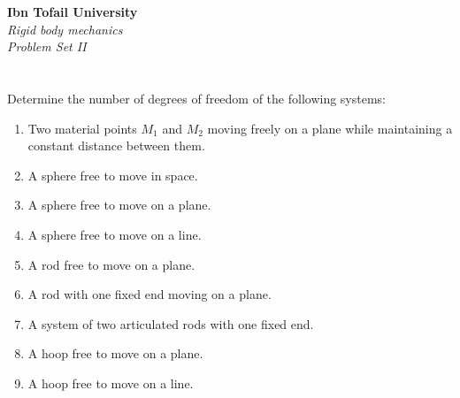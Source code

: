 \documentclass[12pt]{article}
\begin{document}
\begin{center}
\Large\textbf{Ibn Tofail University} \\[1em]
\large\textit{Rigid body mechanics} \\[2em]
\large\textit{Problem Set II} \\[0.5em]
\end{center}

\vspace{1cm}
\section{}

Determine the number of degrees of freedom of the following systems:

\begin{enumerate}
    \item Two material points $M_1$ and $M_2$ moving freely on a plane while maintaining a constant distance between them.
    \item A sphere free to move in space.
    \item A sphere free to move on a plane.
    \item A sphere free to move on a line.
    \item A rod free to move on a plane.
    \item A rod with one fixed end moving on a plane.
    \item A system of two articulated rods with one fixed end.
    \item A hoop free to move on a plane.
    \item A hoop free to move on a line.
\end{enumerate}
\end{document}
